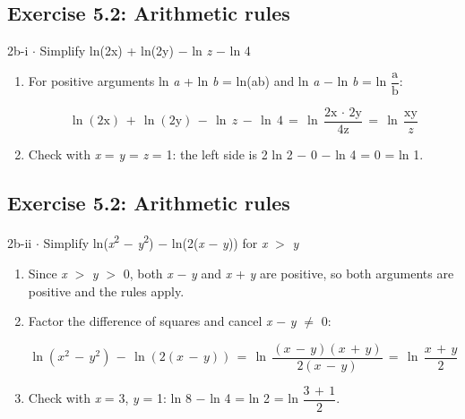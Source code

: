 \documentclass[11pt]{article}
\begin{document}
\begin{keepsection}\subsection{Exercise 5.2: Arithmetic rules}

\begin{workedbox}{2b-i \ensuremath{\cdot} Simplify ln(2x) + ln(2y) \ensuremath{-} ln \textit{z} \ensuremath{-} ln 4}
\begin{enumerate}
\item {}
For positive arguments ln \textit{a} + ln \textit{b} = ln(ab) and ln \textit{a} \ensuremath{-} ln \textit{b} = ln {\small\ensuremath{\dfrac{\mathrm{a}}{\mathrm{b}}}}:

\begin{equation*}\ln (2\mathrm{x})\, +\, \ln (2\mathrm{y})\, -\, \ln \, {z}\, -\, \ln \, 4\, =\, \ln \, \dfrac{2\mathrm{x}\, \cdot \, 2\mathrm{y}}{4\mathrm{z}}\, =\, \ln \, \dfrac{\text{xy}}{{z}}\end{equation*}
\item Check with \textit{x} = \textit{y} = \textit{z} = 1: the left side is 2 ln 2 \ensuremath{-} 0 \ensuremath{-} ln 4 = 0 = ln 1.
\end{enumerate}
\end{workedbox}

\end{keepsection}
\begin{keepsection}\subsection{Exercise 5.2: Arithmetic rules}

\begin{workedbox}{2b-ii \ensuremath{\cdot} Simplify ln(\textit{x}\textsuperscript{2} \ensuremath{-} \textit{y}\textsuperscript{2}) \ensuremath{-} ln(2(\textit{x} \ensuremath{-} \textit{y})) for \textit{x} \ensuremath{>} \textit{y}}
\begin{enumerate}
\item Since \textit{x} \ensuremath{>} \textit{y} \ensuremath{>} 0, both \textit{x} \ensuremath{-} \textit{y} and \textit{x} + \textit{y} are positive, so both arguments are positive and the rules apply.
\item {}
Factor the difference of squares and cancel \textit{x} \ensuremath{-} \textit{y} \ensuremath{\neq} 0:

\begin{equation*}\ln ({x}^{2}\, -\, {y}^{2})\, -\, \ln (2({x}\, -\, {y}))\, =\, \ln \, \dfrac{({x}\, -\, {y})({x}\, +\, {y})}{2({x}\, -\, {y})}\, =\, \ln \, \dfrac{{x}\, +\, {y}}{2}\end{equation*}
\item Check with \textit{x} = 3, \textit{y} = 1: ln 8 \ensuremath{-} ln 4 = ln 2 = ln {\small\ensuremath{\dfrac{3\, +\, 1}{2}}}.
\end{enumerate}
\end{workedbox}

\end{keepsection}
\end{document}
